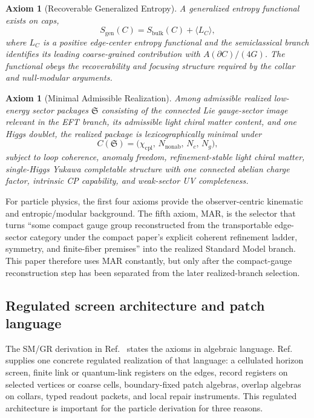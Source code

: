 \documentclass[11pt]{article}
\newtheorem{axiom}[theorem]{Axiom}
\begin{document}
\begin{axiom}[Recoverable Generalized Entropy]\label{ax:entropy}
A generalized entropy functional exists on caps,
\[
S_{\mathrm{gen}}(C)=S_{\mathrm{bulk}}(C)+\langle L_C\rangle,
\]
where \(L_C\) is a positive edge-center entropy functional and the semiclassical branch
identifies its leading coarse-grained contribution with \(A(\partial C)/(4G)\). The functional
obeys the recoverability and focusing structure required by the collar and null-modular
arguments.
\end{axiom}

\begin{axiom}[Minimal Admissible Realization]\label{ax:mar}
Among admissible realized low-energy sector packages \(\mathfrak S\) consisting of the connected
Lie gauge-sector image relevant in the EFT branch, its admissible light chiral matter content,
and one Higgs doublet, the realized package is lexicographically minimal under
\[
C(\mathfrak S)=\bigl(\chi_{\mathrm{cpl}},\,N_{\mathrm{nonab}},\,N_c,\,N_g\bigr),
\]
subject to loop coherence, anomaly freedom, refinement-stable light chiral matter,
single-Higgs Yukawa completable structure with one connected abelian charge factor, intrinsic
CP capability, and weak-sector UV completeness.
\end{axiom}

For particle physics, the first four axioms provide the observer-centric kinematic and
entropic/modular background. The fifth axiom, MAR, is the selector that turns ``some compact
gauge group reconstructed from the transportable edge-sector category under the compact paper's
explicit coherent refinement ladder, symmetry, and finite-fiber premises'' into the realized Standard Model branch. This
paper therefore uses MAR constantly, but only after the compact-gauge reconstruction step has
been separated from the later realized-branch selection.

\subsection{Regulated screen architecture and patch language}

The SM/GR derivation in Ref.~\cite{ophcompact}
states the axioms in algebraic language. Ref.~\cite{ophmicrophysics} supplies one concrete regulated realization of that language: a cellulated horizon screen,
finite link or quantum-link registers on the edges, record registers on selected vertices or
coarse cells, boundary-fixed patch algebras, overlap algebras on collars, typed readout packets,
and local repair instruments. This regulated architecture is important for the particle derivation
for three reasons.
\end{document}
